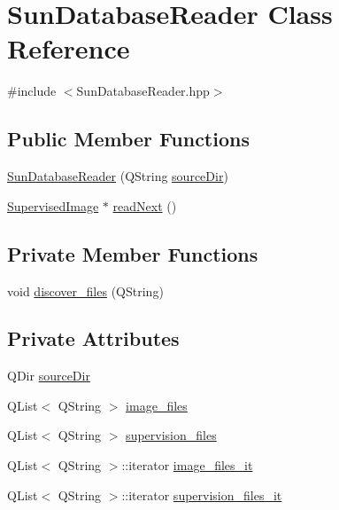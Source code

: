 \hypertarget{class_sun_database_reader}{\section{Sun\+Database\+Reader Class Reference}
\label{class_sun_database_reader}
}


{\ttfamily \#include $<$Sun\+Database\+Reader.\+hpp$>$}

\subsection*{Public Member Functions}
\begin{DoxyCompactItemize}
\item 
\hyperlink{class_sun_database_reader_a7165e085898b5e329402b8acc17f3e0e}{Sun\+Database\+Reader} (Q\+String \hyperlink{class_sun_database_reader_a6bfc31b2ba24be2b3e18c32e0d343d70}{source\+Dir})
\item 
\hyperlink{class_supervised_image}{Supervised\+Image} $\ast$ \hyperlink{class_sun_database_reader_aadf059f614225be059e05a7c3a75fb26}{read\+Next} ()
\end{DoxyCompactItemize}
\subsection*{Private Member Functions}
\begin{DoxyCompactItemize}
\item 
void \hyperlink{class_sun_database_reader_aefbdf63eaff6755bb3dee0ef8687b3aa}{discover\+\_\+files} (Q\+String)
\end{DoxyCompactItemize}
\subsection*{Private Attributes}
\begin{DoxyCompactItemize}
\item 
Q\+Dir \hyperlink{class_sun_database_reader_a6bfc31b2ba24be2b3e18c32e0d343d70}{source\+Dir}
\item 
Q\+List$<$ Q\+String $>$ \hyperlink{class_sun_database_reader_a155716f43a3dc33e1a4d0a2a4a9f3ff1}{image\+\_\+files}
\item 
Q\+List$<$ Q\+String $>$ \hyperlink{class_sun_database_reader_ac5afd4950a668e5cff2bc5c6ea024b60}{supervision\+\_\+files}
\item 
Q\+List$<$ Q\+String $>$\+::iterator \hyperlink{class_sun_database_reader_a227d88c9c5c3d37b0f27123027c0b00e}{image\+\_\+files\+\_\+it}
\item 
Q\+List$<$ Q\+String $>$\+::iterator \hyperlink{class_sun_database_reader_a78e30a0ac9cfa46c23dbdf8d37226b51}{supervision\+\_\+files\+\_\+it}
\end{DoxyCompactItemize}


